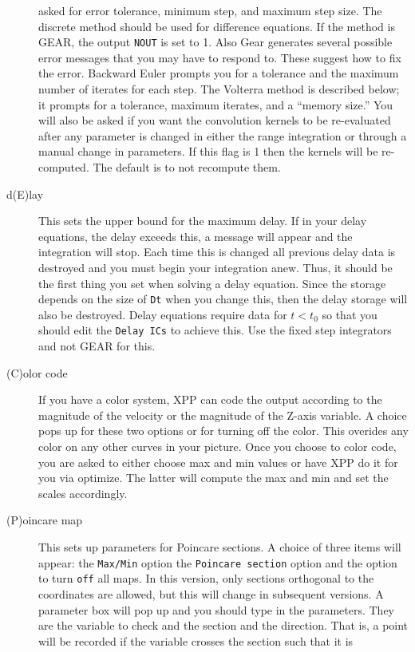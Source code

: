 \begin{description}
 asked for error tolerance, minimum step, and maximum step size.  The discrete
 method should be used for difference equations.  If the method is GEAR, the
 output {\tt NOUT} is set to 1.  Also Gear generates several possible error messages
 that you may have to respond to.  These suggest how to fix the error.
 Backward Euler prompts you for a tolerance and the maximum number of iterates
 for each step. The Volterra method is described below; it prompts for
a tolerance, maximum iterates, and a ``memory size.''  You will also
be asked if you want the convolution kernels to be re-evaluated after
any parameter is changed in either the range integration or through a
manual change in parameters.  If this flag is 1 then the kernels will
be re-computed.  The default is to not recompute them.  
\item[d(E)lay]  This sets the upper bound for the maximum delay.  If in your delay
 equations, the delay exceeds this, a message will appear and the integration 
will stop.  Each time this is changed all previous delay data is destroyed and
 you must begin your integration anew.  Thus, it should be the first thing you
 set when solving a delay equation.  Since the storage depends on the size of
 {\tt Dt} when you change this, then the delay storage will also be
destroyed.  Delay equations require data for $t<t_0$ so that you
should edit the {\tt Delay ICs} to achieve this.  Use the fixed step
integrators and not GEAR for this.
\item[(C)olor code]  If you have a color system, XPP can code the 
output according to
 the magnitude of the velocity or the magnitude of the Z-axis variable.  A choice
 pops up for these two options or for turning off the color.  This overides any
 color on any other curves in your picture.  Once you choose to color code, you
 are asked to either choose max and min values or have XPP do it for you via
 optimize.  The latter will compute the max and min and set the scales accordingly.
\item[(P)oincare map] This sets up parameters for Poincare sections. A choice of
 three items will appear:  the {\tt  Max/Min} option  the
 {\tt Poincare section}
 option
 and the option to turn {\tt off}  all maps. In this version, only
sections
 orthogonal
 to the coordinates are allowed, but this will change in subsequent versions.
  A parameter box will pop up and you should type in the parameters.  They are
 the variable to check and the section and the direction. That is, a point
 will be recorded if the variable crosses the section such that it is 

\end{description}
